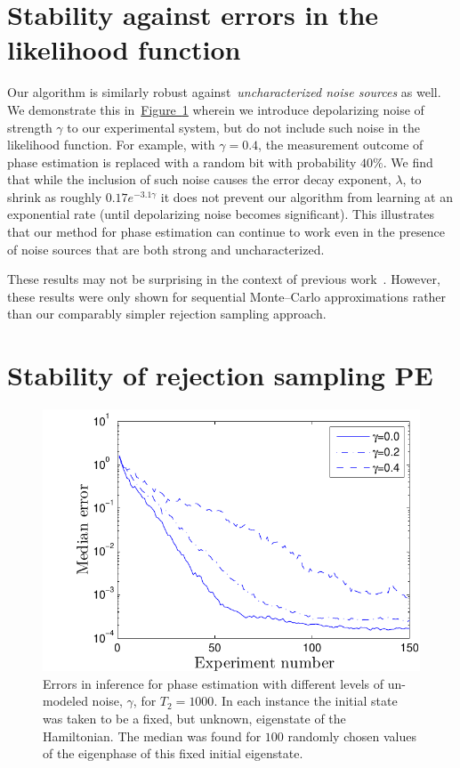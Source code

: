 \documentclass[aps,pra,amsmath,twocolumn,amssymb,superscriptaddress]{revtex4-1}
\newcommand{\fig}[1]{\hyperref[fig:#1]{Figure~\ref*{fig:#1}}}
\begin{document}
\section{Stability against errors in the likelihood function}


Our algorithm is similarly robust against~\emph{uncharacterized noise sources} as well.  We demonstrate this in~\fig{gamma} wherein we introduce depolarizing noise of strength $\gamma$ to our experimental system, but do not include such noise in the likelihood function.  For example, with $\gamma=0.4$, the measurement outcome of phase estimation is replaced with a random bit with probability $40\%$.  We find that while the inclusion of such noise causes the error decay exponent, $\lambda$, to shrink as roughly $0.17e^{-3.1\gamma}$ it does not prevent our algorithm from learning at an exponential rate (until depolarizing noise becomes significant).  This illustrates that our method for phase estimation can continue to work even in the presence of noise sources that are both strong and uncharacterized.

These results may not be surprising in the context of previous work~\cite{wiebe_hamiltonian_2014}.  However, these results were only shown for sequential Monte--Carlo approximations rather than our comparably simpler rejection sampling approach.



\section{Stability of rejection sampling PE}

\begin{figure}
    \begin{centering}
\includegraphics[width=0.45\linewidth]{Gammascale.pdf}
    \end{centering}
    \caption{\label{fig:gamma}
Errors in inference for phase estimation with different levels of un-modeled noise, $\gamma$, for $T_2=1000$.  In each instance the initial state was taken to be a fixed, but unknown, eigenstate of the Hamiltonian.  The median was found for $100$ randomly chosen values of the eigenphase of this fixed initial eigenstate.
    }
\end{figure}
\end{document}
